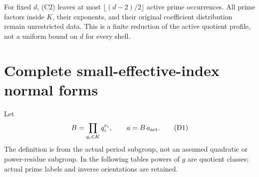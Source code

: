 For fixed $d$, (C2) leaves at most $\lfloor(d-2)/2\rfloor$ active prime
occurrences. All prime factors inside $K$, their exponents, and their original
coefficient distribution remain unrestricted data. This is a finite reduction
of the active quotient profile, not a uniform bound on $d$ for every shell.

\section{Complete small-effective-index normal forms}
Let
\[
 B=\prod_{q_i\in K}q_i^{e_i},\qquad a=B\,a_{\rm act}.
                                                               \tag{D1}
\]
The definition is from the actual period subgroup, not an assumed quadratic
or power-residue subgroup. In the following tables powers of $g$ are quotient
classes; actual prime labels and inverse orientations are retained.

